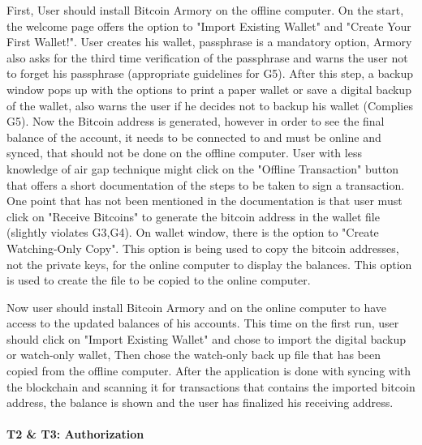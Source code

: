 First, User should install Bitcoin Armory on the offline computer. On the start, the welcome page offers the option to "Import Existing Wallet" and "Create Your First Wallet!". User creates his wallet, passphrase is a mandatory option, Armory also asks for the third time verification of the passphrase and warns the user not to forget his passphrase (appropriate guidelines for G5). After this step, a backup window pops up with the options to print a paper wallet or save a digital backup of the wallet, also warns the user if he decides not to backup his wallet (Complies G5). Now the Bitcoin address is generated, however in order to see the final balance of the account, it needs to be connected to \bitcoinclient and \bitcoinclient must be online and synced, that should not be done on the offline computer. User with less knowledge of air gap technique might click on the "Offline Transaction" button that offers a short documentation of the steps to be taken to sign a transaction. One point that has not been mentioned in the documentation is that user must click on "Receive Bitcoins" to generate the bitcoin address in the wallet file (slightly violates G3,G4). On wallet window, there is the option to "Create Watching-Only Copy". This option is being used to copy the bitcoin addresses, not the private keys, for the online computer to display the balances. This option is used to create the file to be copied to the online computer.

Now user should install Bitcoin Armory and \bitcoinclient on the online computer to have access to the updated balances of his accounts. This time on the first run, user should click on "Import Existing Wallet" and chose to import the digital backup or watch-only wallet, Then chose the watch-only back up file that has been copied from the offline computer. After the application is done with syncing with the blockchain and scanning it for transactions that contains the imported bitcoin address, the balance is shown and the user has finalized his receiving address.


\paragraph{T2 \& T3: Authorization}

